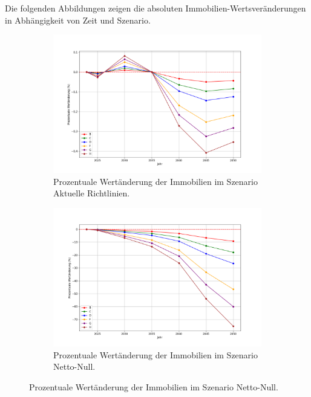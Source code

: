 Die folgenden Abbildungen zeigen die absoluten Immobilien-Wertsveränderungen in Abhängigkeit von Zeit und Szenario.

\begin{figure}[htbp]
    \centering
    \begin{subfigure}[b]{0.48\textwidth}
        \centering
        \includegraphics[width=\textwidth]{figures/Aktuelle Richtlinien_percentage_change_plot.png}
        \caption{Prozentuale Wertänderung der Immobilien im Szenario Aktuelle Richtlinien.}
        \label{fig:aktuelle_richtlinien}
    \end{subfigure}
    \hfill
    \begin{subfigure}[b]{0.48\textwidth}
        \centering
        \includegraphics[width=\textwidth]{figures/Netto-Null_percentage_change_plot.png}
        \caption{Prozentuale Wertänderung der Immobilien im Szenario Netto-Null.}
        \label{fig:netto_null}
    \end{subfigure}
    

\end{figure}
